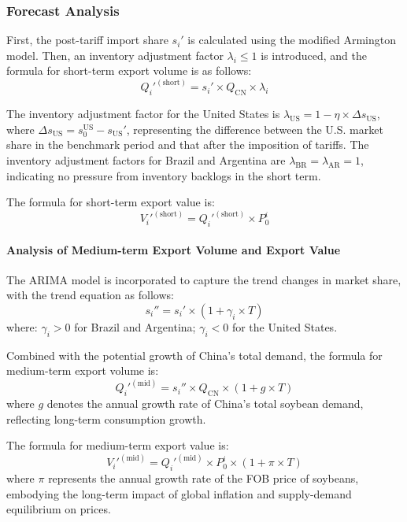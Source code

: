 \documentclass[12pt]{article}
\begin{document}
\subsubsection{Forecast Analysis}
First, the post-tariff import share $s_{i}'$ is calculated using the modified Armington model. Then, an inventory adjustment factor $\lambda_i \leq 1$ is introduced, and the formula for short-term export volume is as follows:
\begin{equation}
Q_{i}'^{(\text{short})} = s_{i}' \times Q_{\text{CN}} \times \lambda_{i}
\end{equation}

The inventory adjustment factor for the United States is $\lambda_{\text{US}} = 1 - \eta \times \Delta s_{\text{US}}$, where $\Delta s_{\text{US}} = s_{0}^{\text{US}} - s_{\text{US}}'$, representing the difference between the U.S. market share in the benchmark period and that after the imposition of tariffs. The inventory adjustment factors for Brazil and Argentina are $\lambda_{\text{BR}} = \lambda_{\text{AR}} = 1$, indicating no pressure from inventory backlogs in the short term.

The formula for short-term export value is:
\begin{equation}
V_{i}'^{(\text{short})} = Q_{i}'^{(\text{short})} \times P_{0}^{i}
\end{equation}

\paragraph{Analysis of Medium-term Export Volume and Export Value}
The ARIMA model is incorporated to capture the trend changes in market share, with the trend equation as follows:
\begin{equation}
s_{i}'' = s_{i}' \times \left(1 + \gamma_{i} \times T\right)
\end{equation}
where: $\gamma_{i} > 0$ for Brazil and Argentina; $\gamma_{i} < 0$ for the United States.

Combined with the potential growth of China's total demand, the formula for medium-term export volume is:
\begin{equation}
Q_{i}'^{(\text{mid})} = s_{i}'' \times Q_{\text{CN}} \times (1 + g \times T)
\end{equation}
where $g$ denotes the annual growth rate of China's total soybean demand, reflecting long-term consumption growth.

The formula for medium-term export value is:
\begin{equation}
V_{i}'^{(\text{mid})} = Q_{i}'^{(\text{mid})} \times P_{0}^{i} \times (1 + \pi \times T)
\end{equation}
where $\pi$ represents the annual growth rate of the FOB price of soybeans, embodying the long-term impact of global inflation and supply-demand equilibrium on prices.
\end{document}

